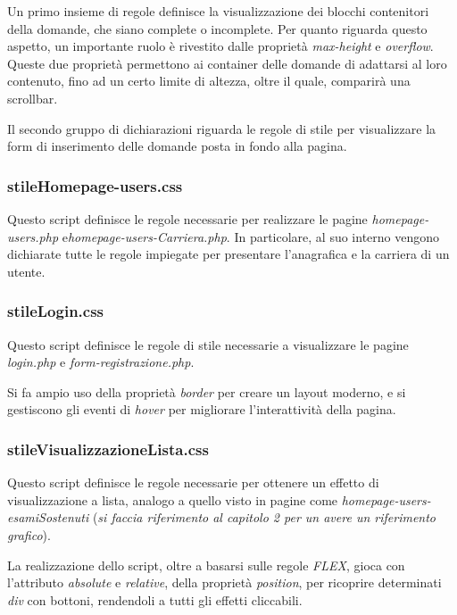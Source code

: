 \documentclass [a4paper,11pt]{book}
\begin{document}
Un primo insieme di regole definisce la visualizzazione dei blocchi contenitori della domande, che siano complete o incomplete. Per quanto riguarda questo aspetto, un importante ruolo è rivestito dalle proprietà \emph{max-height} e \emph{overflow}. Queste due proprietà permettono ai container delle domande di adattarsi al loro contenuto, fino ad un certo limite di altezza, oltre il quale, comparirà una scrollbar.

Il secondo gruppo di dichiarazioni riguarda le regole di stile per visualizzare la form di inserimento delle domande posta in fondo alla pagina.
\medskip

\subsubsection{stileHomepage-users.css}

Questo script definisce le regole necessarie per realizzare le pagine 
\emph{homepage-users.php} e\emph{homepage-users-Carriera.php}. In particolare, al suo interno vengono dichiarate tutte le regole impiegate per presentare l'anagrafica e la carriera di un utente.

\medskip

\subsubsection{stileLogin.css}

Questo script definisce le regole di stile necessarie a visualizzare le pagine \emph{login.php} e \emph{form-registrazione.php}.

Si fa ampio uso della proprietà \emph{border} per creare un layout moderno, e si gestiscono gli eventi di \emph{hover} per migliorare l'interattività della pagina.

\medskip

\subsubsection{stileVisualizzazioneLista.css}

Questo script definisce le regole necessarie per ottenere un effetto di visualizzazione a lista, analogo a quello visto in pagine come \emph{homepage-users-esamiSostenuti} (\emph{si faccia riferimento al capitolo 2 per un avere un riferimento grafico}).

La realizzazione dello script, oltre a basarsi sulle regole \emph{FLEX}, gioca con l'attributo \emph{absolute} e \emph{relative}, della proprietà \emph{position}, per ricoprire determinati \emph{div} con bottoni, rendendoli a tutti gli effetti cliccabili.
\medskip
\end{document}
